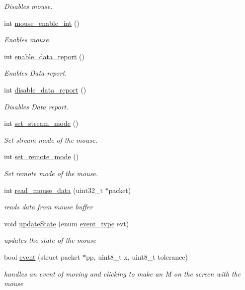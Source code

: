 \begin{DoxyCompactItemize}
\begin{DoxyCompactList}\small\item\em Disables mouse. \end{DoxyCompactList}\item 
int \mbox{\hyperlink{group__mouse_gaf19e0109275a1162be7188deb9c02b41}{mouse\+\_\+enable\+\_\+int}} ()
\begin{DoxyCompactList}\small\item\em Enables mouse. \end{DoxyCompactList}\item 
int \mbox{\hyperlink{group__mouse_ga898e9289d77e1290373396a43ee9c53d}{enable\+\_\+data\+\_\+report}} ()
\begin{DoxyCompactList}\small\item\em Enables Data report. \end{DoxyCompactList}\item 
int \mbox{\hyperlink{group__mouse_ga9d37a10902df825a7445faa3261f1a91}{disable\+\_\+data\+\_\+report}} ()
\begin{DoxyCompactList}\small\item\em Disables Data report. \end{DoxyCompactList}\item 
int \mbox{\hyperlink{group__mouse_gabf86ae410ee145ab149b704b7c09d4a0}{set\+\_\+stream\+\_\+mode}} ()
\begin{DoxyCompactList}\small\item\em Set stream mode of the mouse. \end{DoxyCompactList}\item 
int \mbox{\hyperlink{group__mouse_ga775294026ae46cbb8e4a5d376c0111a2}{set\+\_\+remote\+\_\+mode}} ()
\begin{DoxyCompactList}\small\item\em Set remote mode of the mouse. \end{DoxyCompactList}\item 
int \mbox{\hyperlink{group__mouse_ga41c4d2b9b295568179b689915a8acfa8}{read\+\_\+mouse\+\_\+data}} (uint32\+\_\+t $\ast$packet)
\begin{DoxyCompactList}\small\item\em reads data from mouse buffer \end{DoxyCompactList}\item 
void \mbox{\hyperlink{group__mouse_gabf7bb26fb5683538fbe802be6df228f1}{update\+State}} (enum \mbox{\hyperlink{group__mouse_ga430b444c74dd3fd1472a31714ec5f1ce}{event\+\_\+type}} evt)
\begin{DoxyCompactList}\small\item\em updates the state of the mouse \end{DoxyCompactList}\item 
bool \mbox{\hyperlink{group__mouse_ga0fff8c8e9b1e2af4e52d276fba5aff0b}{event}} (struct packet $\ast$pp, uint8\+\_\+t x, uint8\+\_\+t tolerance)
\begin{DoxyCompactList}\small\item\em handles an event of moving and clicking to make an M on the screen with the mouse \end{DoxyCompactList}\end{DoxyCompactItemize}


